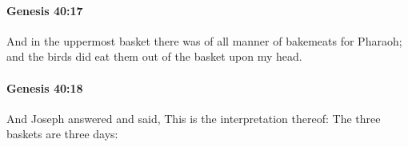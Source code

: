 		\paragraph{Genesis 40:17} %
			\label{GENESIS-40-17}

			And in the uppermost basket there was of all manner of bakemeats for Pharaoh; and the birds did eat them out of the basket upon my head.


		\paragraph{Genesis 40:18} %
			\label{GENESIS-40-18}

			And Joseph answered and said, This is the interpretation thereof: The three baskets are three days:


